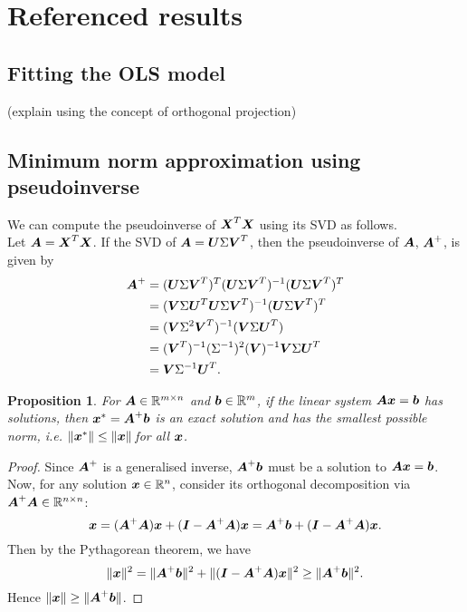 \documentclass[12pt]{article}
\newtheorem{prop}{Proposition}[section]
\newcommand{\Sg}{\Sigma}
\begin{document}
	\section{Referenced results}
	\subsection{Fitting the OLS model\label{sec:append1}}
	(explain using the concept of orthogonal projection)
	
	\subsection{Minimum norm approximation using pseudoinverse\label{sec:append2}}
	We can compute the pseudoinverse of $\boldsymbol{X}^T\boldsymbol{X}$ using its SVD as follows.\\
	
	Let $\boldsymbol{A}=\boldsymbol{X}^T\boldsymbol{X}$. If the SVD of $\bmA=\bmU\Sg\bmV^T$, then the pseudoinverse of $\boldsymbol{A}$, $\boldsymbol{A}^+$, is given by
	\begin{align*}
		\bmA^+&=(\bmU\Sg\bmV^T)^T(\bmU\Sg\bmV^T)^{-1}(\bmU\Sg\bmV^T)^T\\
		&=(\bmV\Sg\bmU^T\bmU\Sg\bmV^T)^{-1}(\bmU\Sg\bmV^T)^T\\
		&=(\bmV\Sg^2\bmV^T)^{-1}(\bmV\Sg\bmU^T)\\
		&=(\bmV^T)^{-1}(\Sg^{-1})^2(\bmV)^{-1}\bmV\Sg\bmU^T\\
		&=\bmV\Sg^{-1}\bmU^T.
	\end{align*}
	
	\begin{prop}
		For $\bmA\in\RR^{m\times n}$ and $\bmb\in\RR^m$, if the linear system $\boldsymbol{A}\boldsymbol{x}=\boldsymbol{b}$ has solutions, then $\boldsymbol{x}^*=\boldsymbol{A}^+\boldsymbol{b}$ is an exact solution and has the smallest possible norm, i.e. $\|\boldsymbol{x}^*\|\leq\|\boldsymbol{x}\|\, $for all $\boldsymbol{x}$.
	\end{prop}
	\begin{proof}
		Since $\boldsymbol{A}^+$ is a generalised inverse, $\boldsymbol{A}^+\boldsymbol{b}$ must be a solution to $\boldsymbol{A}\boldsymbol{x}=\boldsymbol{b}$. Now, for any solution $\bmx\in\Rn$, consider its orthogonal decomposition via $\bmA^+\bmA\in\RR^{n\times n}$:
		$$\boldsymbol{x}=(\boldsymbol{A}^+\boldsymbol{A})\boldsymbol{x}+(\boldsymbol{I}-\boldsymbol{A}^+\boldsymbol{A})\boldsymbol{x}=\boldsymbol{A}^+\boldsymbol{b}+(\boldsymbol{I}-\boldsymbol{A}^+\boldsymbol{A})\boldsymbol{x}.$$
		Then by the Pythagorean theorem, we have
		$$\|\boldsymbol{x}\|^2=\|\boldsymbol{A}^+\boldsymbol{b}\|^2+\|(\boldsymbol{I}-\boldsymbol{A}^+\boldsymbol{A})\boldsymbol{x}\|^2\geq \|\boldsymbol{A}^+\boldsymbol{b}\|^2.$$
		Hence $\|\boldsymbol{x}\|\geq\|\boldsymbol{A}^+\boldsymbol{b}\|$.
	\end{proof}
	
	
\end{document}
